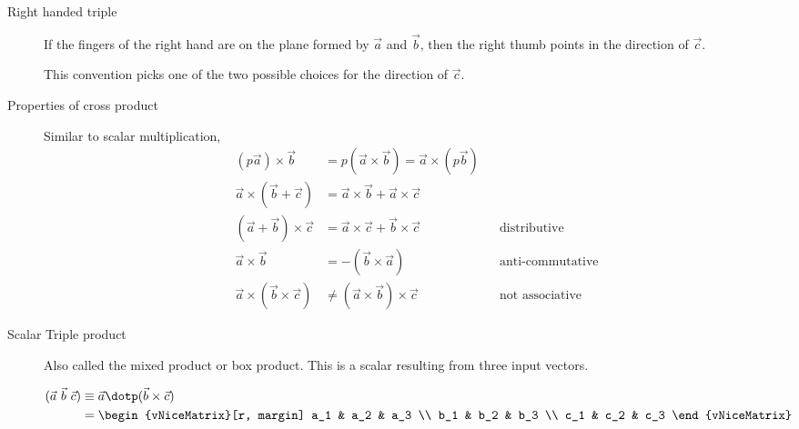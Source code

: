 \begin{description}
    \item[Right handed triple] If the fingers of the right hand are on the plane formed
          by $ \vec{a} $ and $ \vec{b} $, then the right thumb points in the direction of
          $ \vec{c} $. \par
          This convention picks one of the two possible choices for the direction of
          $ \vec{c} $.

    \item[Properties of cross product] Similar to scalar multiplication,
          \begin{align}
              (p\vec{a}) \times \vec{b}               & = p (\vec{a} \times \vec{b}) =
              \vec{a} \times (p\vec{b})                                                  \\
              \vec{a} \times (\vec{b} + \vec{c})      & = \vec{a} \times \vec{b}
              + \vec{a} \times \vec{c}                                                   \\
              (\vec{a} + \vec{b}) \times \vec{c}      & = \vec{a} \times \vec{c}
              + \vec{b} \times \vec{c}                &
                                                      & \text{distributive}              \\
              \vec{a} \times \vec{b}                  & = - (\vec{b} \times \vec{a})   &
                                                      & \text{anti-commutative}          \\
              \vec{a} \times (\vec{b} \times \vec{c}) & \neq
              (\vec{a} \times \vec{b}) \times \vec{c} &
                                                      & \text{not associative}
          \end{align}

    \item[Scalar Triple product] Also called the mixed product or box product. This
          is a scalar resulting from three input vectors. \par
          \begin{align}
              (\vec{a}\ \vec{b}\ \vec{c}) & \equiv \vec{a} \dotp
              (\vec{b} \times \vec{c})                                      \\
                                          & = \begin{vNiceMatrix}[r, margin]
                                                  a_1 & a_2 & a_3 \\
                                                  b_1 & b_2 & b_3 \\
                                                  c_1 & c_2 & c_3
                                              \end{vNiceMatrix}
          \end{align}


\end{description}
